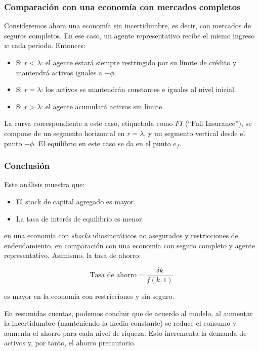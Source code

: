 \documentclass[a4paper,12pt]{article}
\begin{document}
\subsubsection{Comparación con una economía con mercados completos}

Consideremos ahora una economía sin incertidumbre, es decir, con mercados de seguros completos. En ese caso, un agente representativo recibe el mismo ingreso \( w \) cada periodo. Entonces:

\begin{itemize}
	\item Si \( r < \lambda \): el agente estará siempre restringido por su límite de crédito y mantendrá activos iguales a \( -\phi \).
	\item Si \( r = \lambda \): los activos se mantendrán constantes e iguales al nivel inicial.
	\item Si \( r > \lambda \): el agente acumulará activos sin límite.
\end{itemize}

La curva correspondiente a este caso, etiquetada como \( FI \) (``Full Insurance''), se compone de un segmento horizontal en \( r = \lambda	 \), y un segmento vertical desde el punto \( -\phi \). El equilibrio en este caso se da en el punto \( e_f \).

\subsubsection{Conclusión}

Este análisis muestra que:
\begin{itemize}
	\item El stock de capital agregado es mayor.
	\item La tasa de interés de equilibrio es menor.
\end{itemize}

\noindent
en una economía con \textit{shocks} idiosincráticos no asegurados y restricciones de endeudamiento, en comparación con una economía con seguro completo y agente representativo.
Asimismo, la tasa de ahorro:

		\begin{equation}
\text{Tasa de ahorro} = \frac{\delta k}{f(k,1)}
		\end{equation}

\noindent
es mayor en la economía con restricciones y sin seguro.

En resumidas cuentas, podemos concluir que de acuerdo al modelo, al  aumentar la incertidumbre (manteniendo la media constante) se reduce el consumo y aumenta el ahorro para cada nivel de riqueza.
Esto incrementa la demanda de activos y, por tanto, el ahorro precautorio.
\end{document}
